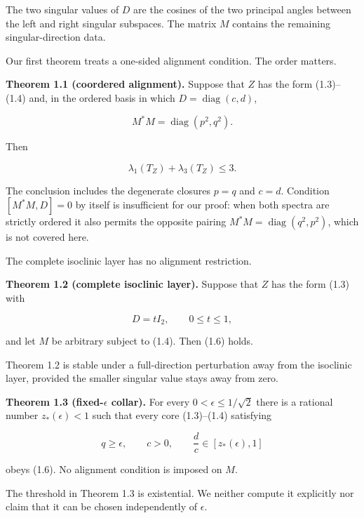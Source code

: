 \documentclass[11pt]{article}
\begin{document}
The two singular values of $D$ are the cosines of the two principal angles between the left and right singular subspaces. The matrix $M$ contains the remaining singular-direction data.

Our first theorem treats a one-sided alignment condition. The order matters.

\textbf{Theorem 1.1 (coordered alignment).} Suppose that $Z$ has the form (1.3)--(1.4) and, in the ordered basis in which $D=\operatorname{diag}(c,d)$,

\begin{equation}
M^*M=\operatorname{diag}(p^2,q^2).
\tag{1.5}
\end{equation}

Then

\begin{equation}
\lambda_1(T_Z)+\lambda_3(T_Z)\le3.
\tag{1.6}
\end{equation}

The conclusion includes the degenerate closures $p=q$ and $c=d$. Condition $[M^*M,D]=0$ by itself is insufficient for our proof: when both spectra are strictly ordered it also permits the opposite pairing $M^*M=\operatorname{diag}(q^2,p^2)$, which is not covered here.

The complete isoclinic layer has no alignment restriction.

\textbf{Theorem 1.2 (complete isoclinic layer).} Suppose that $Z$ has the form (1.3) with

\begin{equation}
D=tI_2,\qquad 0\le t\le1,
\tag{1.7}
\end{equation}

and let $M$ be arbitrary subject to (1.4). Then (1.6) holds.

Theorem 1.2 is stable under a full-direction perturbation away from the isoclinic layer, provided the smaller singular value stays away from zero.

\textbf{Theorem 1.3 (fixed-$\epsilon$ collar).} For every $0<\epsilon\le1/\sqrt2$ there is a rational number $z_*(\epsilon)<1$ such that every core (1.3)--(1.4) satisfying

\begin{equation}
q\ge\epsilon,\qquad c>0,\qquad \frac dc\in[z_*(\epsilon),1]
\tag{1.8}
\end{equation}

obeys (1.6). No alignment condition is imposed on $M$.

The threshold in Theorem 1.3 is existential. We neither compute it explicitly nor claim that it can be chosen independently of $\epsilon$.
\end{document}
